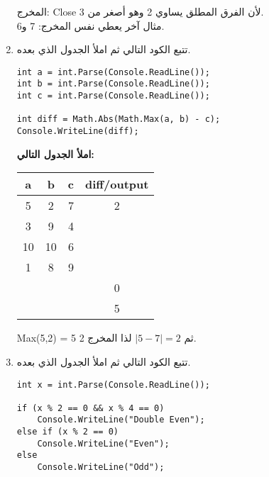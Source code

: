 \documentclass[12pt]{article}
\begin{document}
\begin{enumerate}[itemsep=2em]
\ifwithsols
\begin{boxSolution}
المخرج: \textenglish{Close} لأن الفرق المطلق يساوي 2 وهو أصغر من 3.\\
مثال آخر يعطي نفس المخرج: \textenglish{7} و\textenglish{6}.
\end{boxSolution}
\fi


\item
تتبع الكود التالي ثم املأ الجدول الذي بعده.

\begin{boxCode}
\begin{english}
\begin{verbatim}
int a = int.Parse(Console.ReadLine());
int b = int.Parse(Console.ReadLine());
int c = int.Parse(Console.ReadLine());

int diff = Math.Abs(Math.Max(a, b) - c);
Console.WriteLine(diff);
\end{verbatim}
\end{english}
\end{boxCode}

\textbf{املأ الجدول التالي:}

\begin{center}
\begin{tabular}{|c|c|c|c|}
\hline
\textbf{a} & \textbf{b} & \textbf{c} & \textbf{diff/output} \\
\hline
5 & 2 & 7 & 2 \\
\hline
3 & 9 & 4 &  \\
\hline
10 & 10 & 6 &  \\
\hline
1 & 8 & 9 &  \\
\hline
 &  &  & 0 \\
\hline
 &  &  & 5 \\
\hline
\end{tabular}
\end{center}

\ifwithsols
\begin{boxSolution}
\textenglish{Max(5,2) = 5} ثم \(\lvert 5 - 7 \rvert = 2\) لذا المخرج \textenglish{2}.
\end{boxSolution}
\fi

\clearpage
\item
تتبع الكود التالي ثم املأ الجدول الذي بعده.

\begin{boxCode}
\begin{english}
\begin{verbatim}
int x = int.Parse(Console.ReadLine());

if (x % 2 == 0 && x % 4 == 0)
    Console.WriteLine("Double Even");
else if (x % 2 == 0)
    Console.WriteLine("Even");
else
    Console.WriteLine("Odd");
\end{verbatim}
\end{english}
\end{boxCode}


\end{enumerate}
\end{document}
